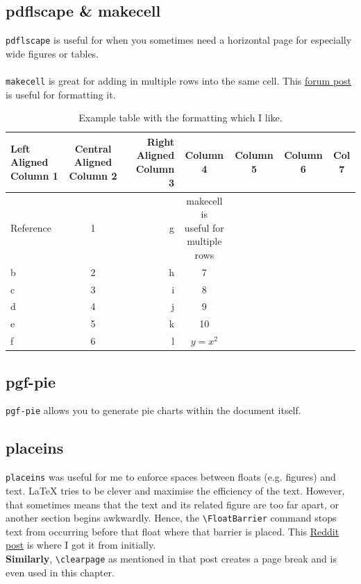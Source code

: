 \clearpage
\begin{landscape}
\subsection{pdflscape \& makecell}
\texttt{pdflscape} is useful for when you sometimes need a horizontal page for especially wide figures or tables.\\\\
\texttt{makecell} is great for adding in multiple rows into the same cell. This \href{https://tex.stackexchange.com/questions/410670/how-to-vertically-and-left-align-a-cell-with-makecell}{forum post} is useful for formatting it.

\begin{table}[!ht]
    \centering
    \caption{Example table with the formatting which I like.}
    \label{tab:my_label}
    \begin{tabular}{lcrcccc}
    \toprule
        Left Aligned Column 1 & Central Aligned Column 2 & Right Aligned Column 3 & Column 4 & Column 5 & Column 6 & Col 7\\
    \midrule
        Reference \cite{whitehead1927principia} & 1 & g & \makecell{makecell is \\ useful for\\ multiple rows} &  &  & \\
        b & 2 & h & 7 &  &  & \\
        c & 3 & i & 8 &  &  & \\
        d & 4 & j & 9 &  &  & \\
        e & 5 & k & 10 &  &  & \\
        f & 6 & l & $y=x^2$ &  &  & \\
     \bottomrule
    \end{tabular}
\end{table}

\end{landscape}
\clearpage

\subsection{pgf-pie}
\texttt{pgf-pie} allows you to generate pie charts within the document itself.

\subsection{placeins}
\texttt{placeins} was useful for me to enforce spaces between floats (e.g. figures) and text. \LaTeX{} tries to be clever and maximise the efficiency of the text. However, that sometimes means that the text and its related figure are too far apart, or another section begins awkwardly. Hence, the \verb|\FloatBarrier| command stops text from occurring before that float where that barrier is placed.
This \href{www.reddit.com/r/LaTeX/comments/u7llg5/how_to_keep_figure_within_a_section/}{Reddit post} is where I got it from initially.\\
\textbf{Similarly}, \verb|\clearpage| as mentioned in that post creates a page break and is even used in this chapter.

